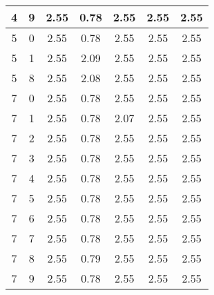 \begin{longtable}{|c|c||c||c|c||c|c|}
	4 & 9 & 2.55 & 0.78 & 2.55 & 2.55 & 2.55 \\ \hline
	5 & 0 & 2.55 & 0.78 & 2.55 & 2.55 & 2.55 \\ \hline
	5 & 1 & 2.55 & 2.09 & 2.55 & 2.55 & 2.55 \\ \hline
	5 & 8 & 2.55 & 2.08 & 2.55 & 2.55 & 2.55 \\ \hline
	7 & 0 & 2.55 & 0.78 & 2.55 & 2.55 & 2.55 \\ \hline
	7 & 1 & 2.55 & 0.78 & 2.07 & 2.55 & 2.55 \\ \hline
	7 & 2 & 2.55 & 0.78 & 2.55 & 2.55 & 2.55 \\ \hline
	7 & 3 & 2.55 & 0.78 & 2.55 & 2.55 & 2.55 \\ \hline
	7 & 4 & 2.55 & 0.78 & 2.55 & 2.55 & 2.55 \\ \hline
	7 & 5 & 2.55 & 0.78 & 2.55 & 2.55 & 2.55 \\ \hline
	7 & 6 & 2.55 & 0.78 & 2.55 & 2.55 & 2.55 \\ \hline
	7 & 7 & 2.55 & 0.78 & 2.55 & 2.55 & 2.55 \\ \hline
	7 & 8 & 2.55 & 0.79 & 2.55 & 2.55 & 2.55 \\ \hline
	7 & 9 & 2.55 & 0.78 & 2.55 & 2.55 & 2.55 \\ \hline
\end{longtable}
\clearpage{}
